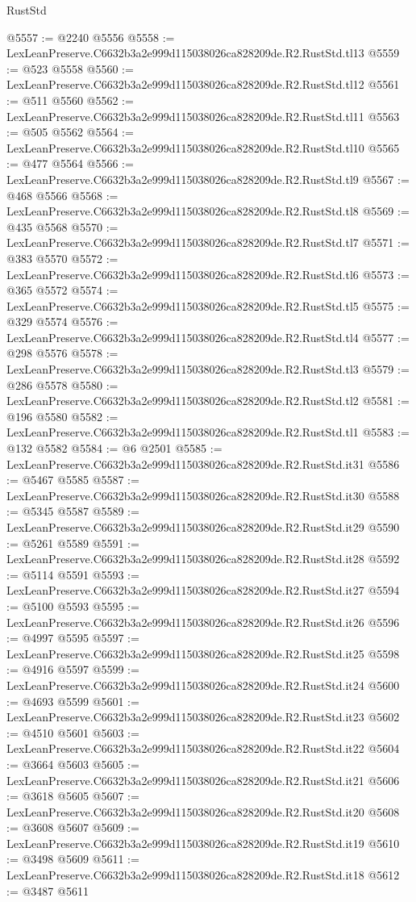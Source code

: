\begin{lexlean}{RustStd}
\begin{coremodule}
@5557 := @2240 @5556
@5558 := LexLeanPreserve.C6632b3a2e999d115038026ca828209de.R2.RustStd.tl13
@5559 := @523 @5558
@5560 := LexLeanPreserve.C6632b3a2e999d115038026ca828209de.R2.RustStd.tl12
@5561 := @511 @5560
@5562 := LexLeanPreserve.C6632b3a2e999d115038026ca828209de.R2.RustStd.tl11
@5563 := @505 @5562
@5564 := LexLeanPreserve.C6632b3a2e999d115038026ca828209de.R2.RustStd.tl10
@5565 := @477 @5564
@5566 := LexLeanPreserve.C6632b3a2e999d115038026ca828209de.R2.RustStd.tl9
@5567 := @468 @5566
@5568 := LexLeanPreserve.C6632b3a2e999d115038026ca828209de.R2.RustStd.tl8
@5569 := @435 @5568
@5570 := LexLeanPreserve.C6632b3a2e999d115038026ca828209de.R2.RustStd.tl7
@5571 := @383 @5570
@5572 := LexLeanPreserve.C6632b3a2e999d115038026ca828209de.R2.RustStd.tl6
@5573 := @365 @5572
@5574 := LexLeanPreserve.C6632b3a2e999d115038026ca828209de.R2.RustStd.tl5
@5575 := @329 @5574
@5576 := LexLeanPreserve.C6632b3a2e999d115038026ca828209de.R2.RustStd.tl4
@5577 := @298 @5576
@5578 := LexLeanPreserve.C6632b3a2e999d115038026ca828209de.R2.RustStd.tl3
@5579 := @286 @5578
@5580 := LexLeanPreserve.C6632b3a2e999d115038026ca828209de.R2.RustStd.tl2
@5581 := @196 @5580
@5582 := LexLeanPreserve.C6632b3a2e999d115038026ca828209de.R2.RustStd.tl1
@5583 := @132 @5582
@5584 := @6 @2501
@5585 := LexLeanPreserve.C6632b3a2e999d115038026ca828209de.R2.RustStd.it31
@5586 := @5467 @5585
@5587 := LexLeanPreserve.C6632b3a2e999d115038026ca828209de.R2.RustStd.it30
@5588 := @5345 @5587
@5589 := LexLeanPreserve.C6632b3a2e999d115038026ca828209de.R2.RustStd.it29
@5590 := @5261 @5589
@5591 := LexLeanPreserve.C6632b3a2e999d115038026ca828209de.R2.RustStd.it28
@5592 := @5114 @5591
@5593 := LexLeanPreserve.C6632b3a2e999d115038026ca828209de.R2.RustStd.it27
@5594 := @5100 @5593
@5595 := LexLeanPreserve.C6632b3a2e999d115038026ca828209de.R2.RustStd.it26
@5596 := @4997 @5595
@5597 := LexLeanPreserve.C6632b3a2e999d115038026ca828209de.R2.RustStd.it25
@5598 := @4916 @5597
@5599 := LexLeanPreserve.C6632b3a2e999d115038026ca828209de.R2.RustStd.it24
@5600 := @4693 @5599
@5601 := LexLeanPreserve.C6632b3a2e999d115038026ca828209de.R2.RustStd.it23
@5602 := @4510 @5601
@5603 := LexLeanPreserve.C6632b3a2e999d115038026ca828209de.R2.RustStd.it22
@5604 := @3664 @5603
@5605 := LexLeanPreserve.C6632b3a2e999d115038026ca828209de.R2.RustStd.it21
@5606 := @3618 @5605
@5607 := LexLeanPreserve.C6632b3a2e999d115038026ca828209de.R2.RustStd.it20
@5608 := @3608 @5607
@5609 := LexLeanPreserve.C6632b3a2e999d115038026ca828209de.R2.RustStd.it19
@5610 := @3498 @5609
@5611 := LexLeanPreserve.C6632b3a2e999d115038026ca828209de.R2.RustStd.it18
@5612 := @3487 @5611

\end{coremodule}
\end{lexlean}
